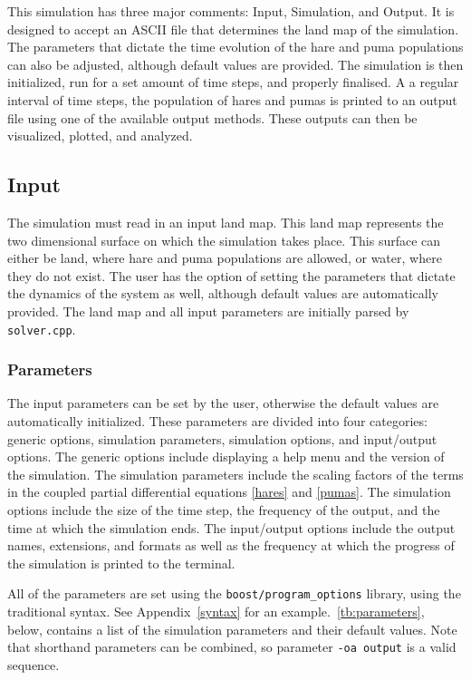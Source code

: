 \documentclass[a4paper,11pt]{article}
\begin{document}
{This simulation has three major comments: Input, Simulation, and Output.  
It is designed to accept an ASCII file that determines the land map of the simulation.
The parameters that dictate the time evolution of the hare and puma populations can also be adjusted, although default values are provided.  
The simulation is then initialized, run for a set amount of time steps, and properly finalised.  
A a regular interval of time steps, the population of hares and pumas is printed to an output file using one of the available output methods.  
These outputs can then be visualized, plotted, and analyzed.

\subsection{Input}

The simulation must read in an input land map.  
This land map represents the two dimensional surface on which the simulation takes place.  
This surface can either be land, where hare and puma populations are allowed, or water, where they do not exist.  
The user has the option of setting the parameters that dictate the dynamics of the system as well, although default values are automatically provided.  
The land map and all input parameters are initially parsed by \texttt{solver.cpp}.

\subsubsection{Parameters}\label{params}

The input parameters can be set by the user, otherwise the default values are automatically initialized.  
These parameters are divided into four categories: generic options, simulation parameters, simulation options, and input/output options.
The generic options include displaying a help menu and the version of the simulation.  
The simulation parameters include the scaling factors of the terms in the coupled partial differential equations \eqref{hares} and \eqref{pumas}.  
The simulation options include the size of the time step, the frequency of the output, and the time at which the simulation ends.  
The input/output options include the output names, extensions, and formats as well as the frequency at which the progress of the simulation is printed to the terminal.  

All of the parameters are set using the \texttt{boost/program\_options} library, using the traditional syntax. 
See Appendix~\ref{syntax} for an example.~\ref{tb:parameters}, below, contains a list of the simulation parameters and their default values. 
Note that shorthand parameters can be combined, so parameter \texttt{-oa output} is a valid sequence.

}
\end{document}
